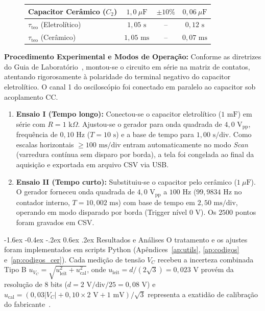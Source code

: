 \documentclass[12pt, a4paper]{article}
\makeatletter
\renewcommand\section{\@startsection {section}{1}{\z@}%
                                   {-1.6ex \@plus -0.4ex \@minus -.2ex}%
                                   {0.6ex \@plus .2ex}%
                                   {\normalfont\large\bfseries}}
\makeatother
\begin{document}
\begin{figure}[H]
\begin{minipage}[c]{0.56\textwidth}
\begin{tabular}{@{}lccc@{}}
            Capacitor Cerâmico ($C_2$) & $1{,}0\ \mu\text{F}$ & $\pm 10\%$ & $0{,}06\ \mu\text{F}$ \\
            \midrule
            $\tau_{\text{teo}}$ (Eletrolítico) & $1{,}05\text{ s}$ & -- & $0{,}12\text{ s}$ \\
            $\tau_{\text{teo}}$ (Cerâmico) & $1{,}05\text{ ms}$ & -- & $0{,}07\text{ ms}$ \\
            \bottomrule
        \end{tabular}
    \end{minipage}
    \vspace{-0.2cm}
\end{figure}

\noindent\textbf{Procedimento Experimental e Modos de Operação:}
Conforme as diretrizes do Guia de Laboratório~\cite{guia}, montou-se o circuito em série na matriz de contatos, atentando rigorosamente à polaridade do terminal negativo do capacitor eletrolítico. O canal 1 do osciloscópio foi conectado em paralelo ao capacitor sob acoplamento CC.
\begin{enumerate}\setlength{\itemsep}{-2pt}
    \item \textbf{Ensaio I (Tempo longo):} Conectou-se o capacitor eletrolítico ($1\text{ mF}$) em série com $R = 1\text{ k}\Omega$. Ajustou-se o gerador para onda quadrada de $4{,}0\text{ V}_{\text{pp}}$, frequência de $0{,}10\text{ Hz}$ ($T = 10\text{ s}$) e a base de tempo para $1{,}00\text{ s/div}$. Como escalas horizontais $\ge 100\text{ ms/div}$ entram automaticamente no modo \textit{Scan} (varredura contínua sem disparo por borda), a tela foi congelada ao final da aquisição e exportada em arquivo CSV via USB.
    \item \textbf{Ensaio II (Tempo curto):} Substituiu-se o capacitor pelo cerâmico ($1\ \mu\text{F}$). O gerador forneceu onda quadrada de $4{,}0\text{ V}_{\text{pp}}$ a $100\text{ Hz}$ ($99{,}9834\text{ Hz}$ no contador interno, $T = 10{,}002\text{ ms}$) com base de tempo em $2{,}50\text{ ms/div}$, operando em modo disparado por borda (Trigger nível $0\text{ V}$). Os $2500$ pontos foram gravados em CSV.
\end{enumerate}

\vspace{-0.25cm}
\section{Resultados e Análises}
\vspace{-0.15cm}
O tratamento e os ajustes foram implementados em scripts Python (Apêndices~\ref{ap:utils}, \ref{ap:codigos} e~\ref{ap:codigos_cer}). Cada medição de tensão $V_C$ recebeu a incerteza combinada Tipo B $u_{V_C} = \sqrt{u_{\text{leit}}^2 + u_{\text{cal}}^2}$, onde $u_{\text{leit}} = d/(2\sqrt{3}) = 0{,}023\text{ V}$ provém da resolução de 8 bits ($d = 2\text{ V/div} / 25 = 0{,}08\text{ V}$) e $u_{\text{cal}} = (0{,}03 |V_C| + 0{,}10 \times 2\text{ V} + 1\text{ mV})/\sqrt{3}$ representa a exatidão de calibração do fabricante~\cite{tektronix}.
\end{document}
